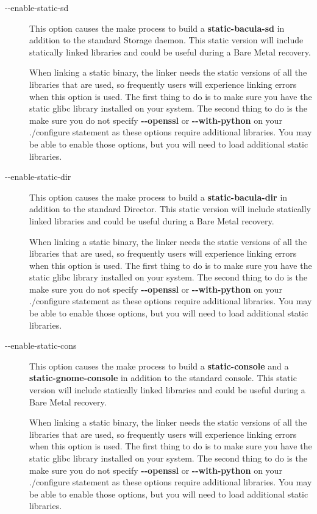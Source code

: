 \begin{description}
\item [ {-}{-}enable-static-sd]
   This option causes the make process to build a {\bf static-bacula-sd} in
   addition to the standard Storage daemon.  This static version will
   include statically linked libraries and could be useful during a Bare
   Metal recovery.

   When linking a static binary, the linker needs the static versions
   of all the libraries that are used, so frequently users will 
   experience linking errors when this option is used. The first 
   thing to do is to make sure you have the static glibc library 
   installed on your system. The second thing to do is the make sure
   you do not specify {\bf {-}{-}openssl} or {\bf {-}{-}with-python}
   on your ./configure statement as these options require additional
   libraries. You may be able to enable those options, but you will
   need to load additional static libraries.


\item [ {-}{-}enable-static-dir]
   This option causes the make process to build a {\bf static-bacula-dir}
   in addition to the standard Director.  This static version will include
   statically linked libraries and could be useful during a Bare Metal
   recovery.

   When linking a static binary, the linker needs the static versions
   of all the libraries that are used, so frequently users will 
   experience linking errors when this option is used. The first 
   thing to do is to make sure you have the static glibc library 
   installed on your system. The second thing to do is the make sure
   you do not specify {\bf {-}{-}openssl} or {\bf {-}{-}with-python}
   on your ./configure statement as these options require additional
   libraries. You may be able to enable those options, but you will
   need to load additional static libraries.


\item [ {-}{-}enable-static-cons]
   This option causes the make process to build a {\bf static-console} and
   a {\bf static-gnome-console} in addition to the standard console.  This
   static version will include statically linked libraries and could be
   useful during a Bare Metal recovery.

   When linking a static binary, the linker needs the static versions
   of all the libraries that are used, so frequently users will 
   experience linking errors when this option is used. The first 
   thing to do is to make sure you have the static glibc library 
   installed on your system. The second thing to do is the make sure
   you do not specify {\bf {-}{-}openssl} or {\bf {-}{-}with-python}
   on your ./configure statement as these options require additional
   libraries. You may be able to enable those options, but you will
   need to load additional static libraries.



\end{description}
